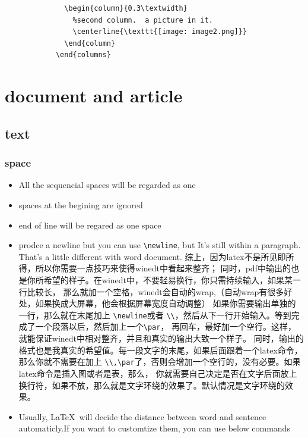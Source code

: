 \documentclass[a4paper,12pt,twoside]{book}
\begin{document}
\begin{CJK*}{UTF8}{song}
\begin{itemize}
\begin{verbatim}
			  \begin{column}{0.3\textwidth}
			    %second column.  a picture in it.
			    \centerline{\texttt{[image: image2.png]}}
			  \end{column}
			\end{columns}
		\end{verbatim}
	\end{itemize}


\section{document and article}	
	\subsection{text}
		\subsubsection{space}
		\begin{itemize}
		\item All the sequencial spaces will be regarded as one
		\item spaces at the begining are ignored
		\item end of line will be regared as one space
		\item prodce a newline but you can use \verb=\newline=, but It's still within a paragraph. That's a little different with word document. 综上，因为latex不是所见即所得，所以你需要一点技巧来使得winedt中看起来整齐； 同时，pdf中输出的也是你所希望的样子。在winedt中，不要轻易换行，你只需持续输入，如果某一行比较长， 那么就加一个空格，winedt会自动的wrap,（自动wrap有很多好处，如果换成大屏幕，他会根据屏幕宽度自动调整） 如果你需要输出单独的一行，那么就在末尾加上 \verb=\newline=或者 \verb=\\=，然后从下一行开始输入。等到完成了一个段落以后，然后加上一个\verb=\par=， 再回车，最好加一个空行。这样，就能保证winedt中相对整齐，并且和真实的输出大致一个样子。 同时，输出的格式也是我真实的希望值。每一段文字的末尾，如果后面跟着一个latex命令， 那么你就不需要在加上 \verb=\\,\par=了，否则会增加一个空行的，没有必要。如果latex命令是插入图或者是表，那么， 你就需要自己决定是否在文字后面放上换行符，如果不放，那么就是文字环绕的效果了。默认情况是文字环绕的效果。
		\item Usually, \LaTeX\ will decide the distance between word and sentence automaticly.If you want to customtize them, you can use below commands

\end{itemize}
\end{CJK*}
\end{document}
